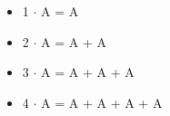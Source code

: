 \begin{itemize}
    \item[] 1 $\cdot$ A = A
    \item[] 2 $\cdot$ A = A + A
    \item[] 3 $\cdot$ A = A + A + A
    \item[] 4 $\cdot$ A = A + A + A + A
\end{itemize}

